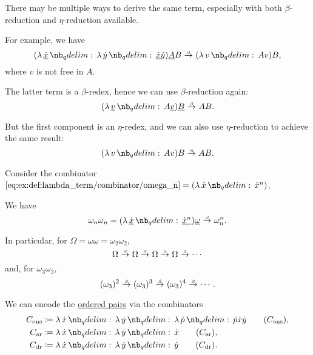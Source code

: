\begin{example}
\begin{thmenum}
     There may be multiple ways to derive the same term, especially with both \( \beta \)-reduction and \( \eta \)-reduction available.

    For example, we have
    \begin{equation*}
      (\qabs {\hi{\synx}} \qabs \syny \hi{\synx} \syny) \hi{A} B \bred (\qabs v A v) B,
    \end{equation*}
    where \( v \) is not free in \( A \).

    The latter term is a \( \beta \)-redex, hence we can use \( \beta \)-reduction again:
    \begin{equation*}
      (\qabs {\hi{v}} A \hi{v}) \hi{B} \bred AB.
    \end{equation*}

    But the first component is an \( \eta \)-redex, and we can also use \( \eta \)-reduction to achieve the same result:
    \begin{equation*}
      (\qabs v A v) B \ered AB.
    \end{equation*}

     Consider the combinator \( \ref{eq:ex:def:lambda_term/combinator/omega_n} = (\qabs \synx \synx^n) \).

    We have
    \begin{equation*}
      \omega_n \omega_n
      =
      (\qabs {\hi{\synx}} \hi{\synx^n}) \hi{\omega}
      \bred
      \omega_n^n.
    \end{equation*}

    In particular, for \( \Omega = \omega \omega = \omega_2 \omega_2 \),
    \begin{equation*}
      \Omega \bred \Omega \bred \Omega \bred \Omega \bred \cdots
    \end{equation*}
    and, for \( \omega_3 \omega_3 \),
    \begin{equation*}
      (\omega_3)^2 \bred (\omega_3)^3 \bred (\omega_3)^4 \bred \cdots.
    \end{equation*}

     We can encode the \hyperref[def:ordered_tuple]{ordered pairs} via the combinators
    \begin{align}
      C_{\T{ons}} &\coloneqq \qabs \synx \qabs \syny \qabs \synp \synp \synx \syny \label{ex:def:beta_eta_reduction/pair/cons}\tag{\ensuremath{ C_{\T{ons}} }}, \\
      C_{\T{ar}}  &\coloneqq \qabs \synx \qabs \syny \synx \label{ex:def:beta_eta_reduction/pair/car}\tag{\ensuremath{ C_{\T{ar}} }}, \\
      C_{\T{dr}}  &\coloneqq \qabs \synx \qabs \syny \syny \label{ex:def:beta_eta_reduction/pair/cdr}\tag{\ensuremath{ C_{\T{dr}} }}.
    \end{align}


\end{thmenum}
\end{example}
